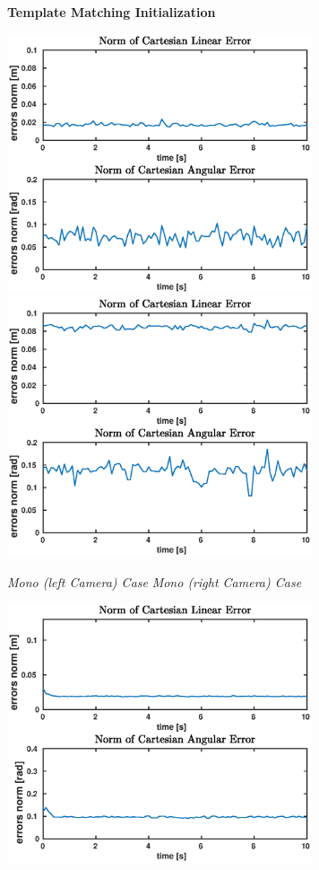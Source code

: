 \begin{figure}
	\centering
	\textbf{Template Matching Initialization}\\
	\vspace*{20px}
	\centerline{
		\includegraphics[width=9cm]{tracking/templ-mono-left.eps}
		\includegraphics[width=9cm]{tracking/templ-mono-right.eps}
	}
	\hspace*{15px}\textit{Mono (left Camera) Case} \hspace{125px} \textit{Mono (right Camera) Case}\\
	\vspace{30px}
	\centerline{
		\includegraphics[width=9cm]{tracking/templ-stereo.eps}
}
\end{figure}
